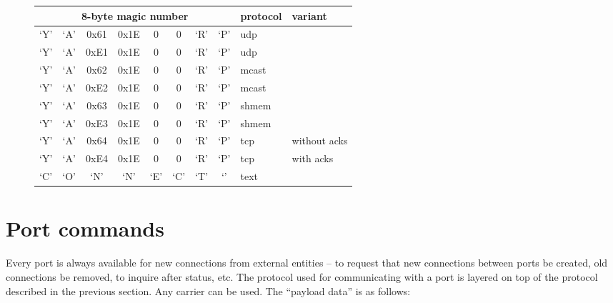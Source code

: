 \documentclass[a4]{article}
\begin{document}
\begin{figure}[h]
\begin{tabular}{|cccccccc|l|l|}
\hline
\multicolumn{8}{|c|}{\bf 8-byte magic number} & {\bf protocol} & {\bf variant} \\ \hline\hline
`Y' & `A' & 0x61 & 0x1E & 0 & 0 & `R' & `P'  & udp & \\
`Y' & `A' & 0xE1 & 0x1E & 0 & 0 & `R' & `P'  & udp & \\
`Y' & `A' & 0x62 & 0x1E & 0 & 0 & `R' & `P'  & mcast & \\
`Y' & `A' & 0xE2 & 0x1E & 0 & 0 & `R' & `P'  & mcast & \\
`Y' & `A' & 0x63 & 0x1E & 0 & 0 & `R' & `P'  & shmem & \\
`Y' & `A' & 0xE3 & 0x1E & 0 & 0 & `R' & `P'  & shmem & \\
`Y' & `A' & 0x64 & 0x1E & 0 & 0 & `R' & `P'  & tcp & without acks \\
`Y' & `A' & 0xE4 & 0x1E & 0 & 0 & `R' & `P'  & tcp & with acks \\
`C' & `O' & `N'  & `N'  & `E' & `C' & `T' & `\textvisiblespace{}'  & text & \\
\hline
\end{tabular}
\end{figure}

\section{Port commands}

Every port is always available for new connections from external
entities -- to request that new connections between ports be created,
old connections be removed, to inquire after status, etc.
%
The protocol used for communicating with a port is layered on top of the
protocol described in the previous section.  Any carrier can be used.
The ``payload data'' is as follows:
\end{document}
